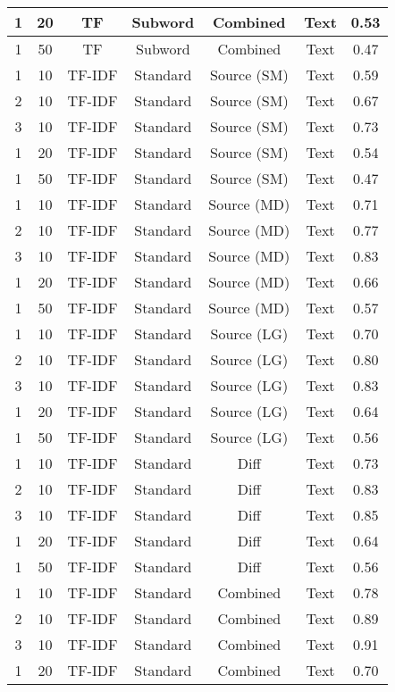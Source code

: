 \begin{longtable}{|c|c|c|c|c|c|c|}
\hline
1 & 20 & TF & Subword & Combined & Text & 0.53 \\
\hline
1 & 50 & TF & Subword & Combined & Text & 0.47 \\
\hline
1 & 10 & TF-IDF & Standard & Source (SM) & Text & 0.59 \\
\hline
2 & 10 & TF-IDF & Standard & Source (SM) & Text & 0.67 \\
\hline
3 & 10 & TF-IDF & Standard & Source (SM) & Text & 0.73 \\
\hline
1 & 20 & TF-IDF & Standard & Source (SM) & Text & 0.54 \\
\hline
1 & 50 & TF-IDF & Standard & Source (SM) & Text & 0.47 \\
\hline
1 & 10 & TF-IDF & Standard & Source (MD) & Text & 0.71 \\
\hline
2 & 10 & TF-IDF & Standard & Source (MD) & Text & 0.77 \\
\hline
3 & 10 & TF-IDF & Standard & Source (MD) & Text & 0.83 \\
\hline
1 & 20 & TF-IDF & Standard & Source (MD) & Text & 0.66 \\
\hline
1 & 50 & TF-IDF & Standard & Source (MD) & Text & 0.57 \\
\hline
1 & 10 & TF-IDF & Standard & Source (LG) & Text & 0.70 \\
\hline
2 & 10 & TF-IDF & Standard & Source (LG) & Text & 0.80 \\
\hline
3 & 10 & TF-IDF & Standard & Source (LG) & Text & 0.83 \\
\hline
1 & 20 & TF-IDF & Standard & Source (LG) & Text & 0.64 \\
\hline
1 & 50 & TF-IDF & Standard & Source (LG) & Text & 0.56 \\
\hline
1 & 10 & TF-IDF & Standard & Diff & Text & 0.73 \\
\hline
2 & 10 & TF-IDF & Standard & Diff & Text & 0.83 \\
\hline
3 & 10 & TF-IDF & Standard & Diff & Text & 0.85 \\
\hline
1 & 20 & TF-IDF & Standard & Diff & Text & 0.64 \\
\hline
1 & 50 & TF-IDF & Standard & Diff & Text & 0.56 \\
\hline
1 & 10 & TF-IDF & Standard & Combined & Text & 0.78 \\
\hline
2 & 10 & TF-IDF & Standard & Combined & Text & 0.89 \\
\hline
3 & 10 & TF-IDF & Standard & Combined & Text & 0.91 \\
\hline
1 & 20 & TF-IDF & Standard & Combined & Text & 0.70 \\

\end{longtable}
